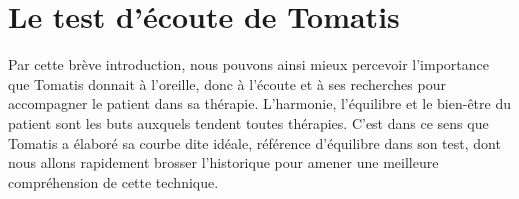
\section{Le test d'écoute de Tomatis}
Par cette brève introduction, nous pouvons ainsi mieux percevoir l'importance que Tomatis donnait à l'oreille, donc à l'écoute et à ses recherches pour accompagner le patient dans sa thérapie.
L'harmonie, l'équilibre et le bien-être du patient sont les buts auxquels tendent  toutes thérapies. C'est 
dans ce sens que Tomatis a élaboré sa courbe dite idéale, référence d'équilibre dans son test, dont nous 
allons rapidement brosser l'historique pour amener une meilleure compréhension de cette technique.


